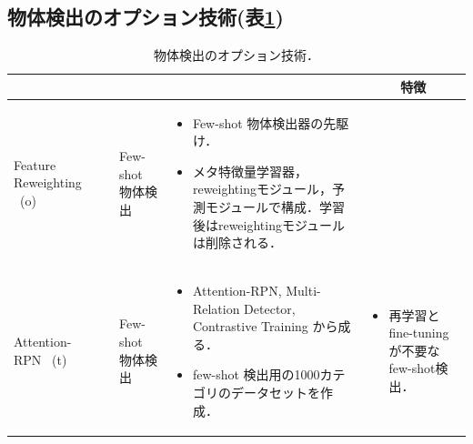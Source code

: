 \documentclass[twocolumn]{jsarticle} %
\begin{document}
\subsection{物体検出のオプション技術(表\ref{tbl-select-sub})}
\begin{table}
    \caption{物体検出のオプション技術．}
    \label{tbl-select-sub}
    \begin{center}
        \setlength{\tabcolsep}{3pt}
        \footnotesize
        \begin{tabularx}{\linewidth}{Xp{1.5cm}Xp{7cm}X} \toprule
            \centering{モデル名称} & \centering{文献} & \centering{用途} & \centering{概要} & \multicolumn{1}{c}{特徴} \\ \midrule

            Feature Reweighting \ (o)
            \vspace{0.7\baselineskip}
            \footnote[2] & \cite{KLWYFD19} & Few-shot 物体検出 & 
            \begin{itemize}
                \vspace{-0.7\baselineskip}
                \setlength{\leftskip}{-3mm}
                \item Few-shot 物体検出器の先駆け．
                \item メタ特徴量学習器，reweightingモジュール，予測モジュールで構成．学習後はreweightingモジュールは削除される．
            \end{itemize}
            &
            \\

            Attention-RPN \ (t)
            \vspace{0.7\baselineskip}
            \footnote[1] & \cite{FZTT20} & Few-shot 物体検出 & 
            \begin{itemize}
                \vspace{-0.7\baselineskip}
                \setlength{\leftskip}{-3mm}
                \item Attention-RPN, Multi-Relation Detector, Contrastive Training から成る．
                \item few-shot 検出用の1000カテゴリのデータセットを作成．
            \end{itemize}
            &
            \begin{itemize}
                \vspace{-0.7\baselineskip}
                \setlength{\leftskip}{-3mm}
                \item 再学習とfine-tuningが不要なfew-shot検出．
            \end{itemize}
            \\


\end{tabularx}
\end{center}
\end{table}
\end{document}
